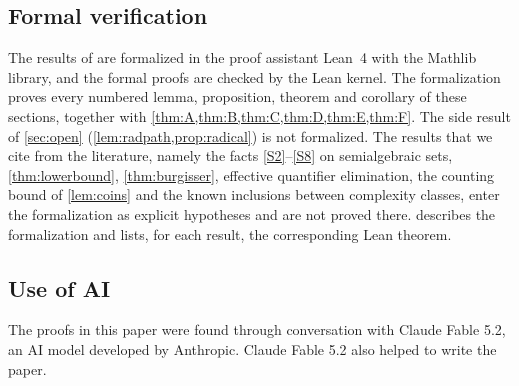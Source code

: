 \subsection{Formal verification}

The results of  are formalized in the proof assistant Lean~4 with the Mathlib library, and the formal proofs are checked by the Lean kernel. The formalization proves every numbered lemma, proposition, theorem and corollary of these sections, together with \cref{thm:A,thm:B,thm:C,thm:D,thm:E,thm:F}. The side result of \cref{sec:open} (\cref{lem:radpath,prop:radical}) is not formalized. The results that we cite from the literature, namely the facts \ref{S2}--\ref{S8} on semialgebraic sets, \cref{thm:lowerbound}, \cref{thm:burgisser}, effective quantifier elimination, the counting bound of \cref{lem:coins} and the known inclusions between complexity classes, enter the formalization as explicit hypotheses and are not proved there.  describes the formalization and lists, for each result, the corresponding Lean theorem.

\subsection{Use of AI}

The proofs in this paper were found through conversation with Claude Fable 5.2, an AI model developed by Anthropic. Claude Fable 5.2 also helped to write the paper.
